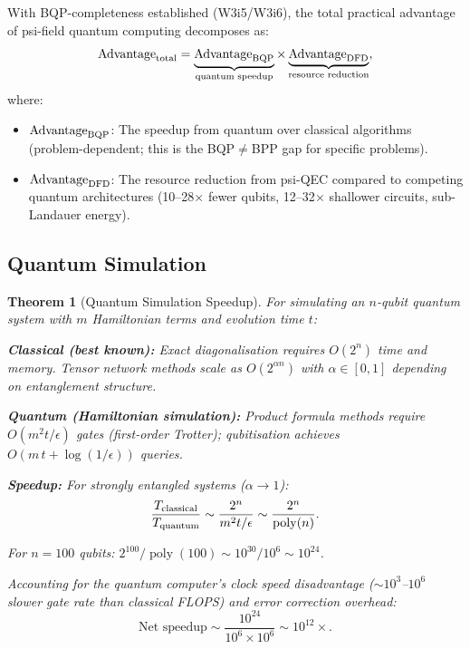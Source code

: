 \documentclass[11pt]{article}
\newtheorem{theorem}{Theorem}[section]
\theoremstyle{definition}
\theoremstyle{remark}
\DeclareMathOperator{\poly}{poly}
\begin{document}
With BQP-completeness established (W3i5/W3i6), the total practical
advantage of psi-field quantum computing decomposes as:
\begin{equation}
  \text{Advantage}_{\rm total} = \underbrace{\text{Advantage}_{\rm BQP}
  }_{\text{quantum speedup}} \times \underbrace{\text{Advantage}_{\rm DFD}
  }_{\text{resource reduction}},
  \label{eq:total-advantage}
\end{equation}
where:
\begin{itemize}[nosep]
  \item $\text{Advantage}_{\rm BQP}$: The speedup from quantum over
    classical algorithms (problem-dependent; this is the BQP$\neq$BPP
    gap for specific problems).
  \item $\text{Advantage}_{\rm DFD}$: The resource reduction from
    psi-QEC compared to competing quantum architectures (10--28$\times$
    fewer qubits, 12--32$\times$ shallower circuits, sub-Landauer energy).
\end{itemize}

\subsection{Quantum Simulation}
\label{sec:sim-speedup}

\begin{theorem}[Quantum Simulation Speedup]
\label{thm:sim-speedup}
For simulating an $n$-qubit quantum system with $m$ Hamiltonian terms
and evolution time $t$:

\textbf{Classical (best known):} Exact diagonalisation requires
$O(2^n)$ time and memory. Tensor network methods scale as $O(2^{\alpha n})$
with $\alpha \in [0,1]$ depending on entanglement structure.

\textbf{Quantum (Hamiltonian simulation):} Product formula methods
require $O(m^2 t / \epsilon)$ gates (first-order Trotter);
qubitisation achieves $O(m\,t + \log(1/\epsilon))$ queries.

\textbf{Speedup:} For strongly entangled systems ($\alpha \to 1$):
\begin{equation}
  \frac{T_{\rm classical}}{T_{\rm quantum}} \sim
  \frac{2^n}{m^2 t / \epsilon} \sim \frac{2^n}{\poly(n)}.
  \label{eq:sim-speedup}
\end{equation}

For $n = 100$ qubits: $2^{100}/\poly(100) \sim 10^{30}/10^6
\sim 10^{24}$.

Accounting for the quantum computer's clock speed disadvantage
($\sim 10^3$--$10^6$ slower gate rate than classical FLOPS) and
error correction overhead:
\begin{equation}
  \text{Net speedup} \sim \frac{10^{24}}{10^6 \times 10^6}
  \sim 10^{12}\times.
  \label{eq:net-sim-speedup}
\end{equation}
\end{theorem}
\end{document}
